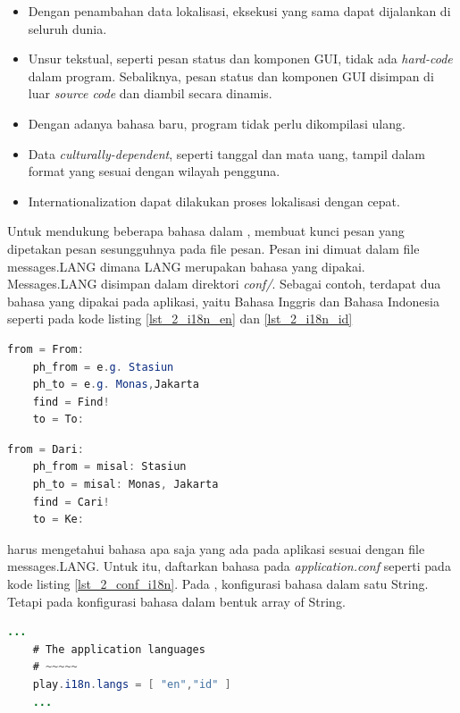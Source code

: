 \begin{itemize}
	\item Dengan penambahan data lokalisasi, eksekusi yang sama dapat dijalankan di seluruh dunia.
	\item Unsur tekstual, seperti pesan status dan komponen GUI, tidak ada \textit{hard-code} dalam program. Sebaliknya, pesan status dan komponen GUI disimpan di luar \textit{source code} dan diambil secara dinamis.
	\item Dengan adanya bahasa baru, program tidak perlu dikompilasi ulang.
	\item Data \textit{culturally-dependent}, seperti tanggal dan mata uang, tampil dalam format yang sesuai dengan wilayah pengguna.
	\item Internationalization dapat dilakukan proses lokalisasi dengan cepat.
\end{itemize}

Untuk mendukung beberapa bahasa dalam \play, membuat kunci pesan yang dipetakan pesan sesungguhnya pada file pesan. Pesan ini dimuat dalam file messages.LANG dimana LANG merupakan bahasa yang dipakai. Messages.LANG disimpan dalam direktori \textit{conf/}. Sebagai contoh, terdapat dua bahasa yang dipakai pada aplikasi, yaitu Bahasa Inggris dan Bahasa Indonesia seperti pada kode listing \ref{lst_2_i18n_en} dan \ref{lst_2_i18n_id}

\begin{lstlisting}[caption=Contoh messages.en untuk i18n,label = {lst_2_i18n_en},language=Java]
	from = From:
	ph_from = e.g. Stasiun
	ph_to = e.g. Monas,Jakarta
	find = Find!
	to = To:
\end{lstlisting}

\begin{lstlisting}[caption=Contoh messages.id untuk i18n,label = {lst_2_i18n_id},language=Java]
	from = Dari:
	ph_from = misal: Stasiun
	ph_to = misal: Monas, Jakarta
	find = Cari!
	to = Ke:
\end{lstlisting}

\play harus mengetahui bahasa apa saja yang ada pada aplikasi sesuai dengan file messages.LANG. Untuk itu, daftarkan bahasa pada \textit{application.conf} seperti pada kode listing \ref{lst_2_conf_i18n}. Pada \cite{playforjava}, konfigurasi bahasa dalam satu String. Tetapi pada  konfigurasi bahasa dalam bentuk array of String.

\begin{lstlisting}[caption=Konfigurasi Bahasa i18n,label = {lst_2_conf_i18n},language=Java]
	...
	# The application languages
	# ~~~~~
	play.i18n.langs = [ "en","id" ]
	...
\end{lstlisting}

